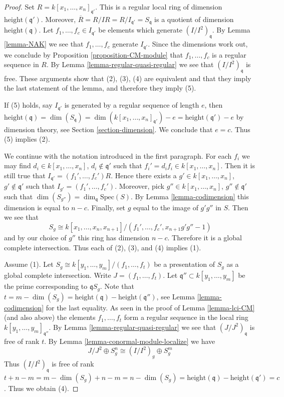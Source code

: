 \begin{proof}
Set $R = k[x_1, \ldots, x_n]_{\mathfrak q'}$. This is a regular local
ring of dimension $\text{height}(\mathfrak q')$. Moreover,
$\overline{R} = R/IR = R/I_{\mathfrak q'} = S_{\mathfrak q}$
is a quotient of dimension $\text{height}(\mathfrak q)$.
Let $f_1, \ldots, f_c \in I_{\mathfrak q'}$ be elements
which generate $(I/I^2)_{\mathfrak q}$. By Lemma \ref{lemma-NAK}
we see that $f_1, \ldots, f_c$ generate $I_{\mathfrak q'}$.
Since the dimensions work out, we conclude
by Proposition \ref{proposition-CM-module} that
$f_1, \ldots, f_c$ is a regular sequence in $R$.
By Lemma \ref{lemma-regular-quasi-regular} we see that
$(I/I^2)_{\mathfrak q}$ is free.
These arguments show that (2), (3), (4) are equivalent and
that they imply the last statement of the lemma, and therefore
they imply (5).

\medskip\noindent
If (5) holds, say $I_{\mathfrak q'}$ is generated by a regular
sequence of length $e$, then
$\text{height}(\mathfrak q) = \dim(S_{\mathfrak q}) =
\dim(k[x_1, \ldots, x_n]_{\mathfrak q'}) - e =
\text{height}(\mathfrak q') - e$ by dimension theory,
see Section \ref{section-dimension}. We conclude that $e = c$.
Thus (5) implies (2).

\medskip\noindent
We continue with the notation introduced in the first paragraph.
For each $f_i$ we may find $d_i \in k[x_1, \ldots, x_n]$,
$d_i \not \in \mathfrak q'$ such that
$f_i' = d_i f_i \in k[x_1, \ldots, x_n]$.
Then it is still true that $I_{\mathfrak q'} = (f_1', \ldots, f_c')R$.
Hence there exists a $g' \in k[x_1, \ldots, x_n]$, $g' \not \in \mathfrak q'$
such that $I_{g'} = (f_1', \ldots, f_c')$.
Moreover, pick $g'' \in k[x_1, \ldots, x_n]$, $g'' \not \in \mathfrak q'$
such that $\dim(S_{g''}) = \dim_{\mathfrak q} \text{Spec}(S)$.
By Lemma \ref{lemma-codimension} this dimension is equal to $n - c$.
Finally, set $g$ equal to the image of $g'g''$ in $S$.
Then we see that
$$
S_g \cong k[x_1, \ldots, x_n, x_{n + 1}]
/
(f_1', \ldots, f_c', x_{n + 1}g'g'' - 1)
$$
and by our choice of $g''$ this ring has dimension $n - c$.
Therefore it is a global complete intersection.
Thus each of (2), (3), and (4) implies (1).

\medskip\noindent
Assume (1). Let $S_g \cong k[y_1, \ldots, y_m]/(f_1, \ldots, f_t)$
be a presentation of $S_g$ as a global complete intersection.
Write $J = (f_1, \ldots, f_t)$. Let $\mathfrak q'' \subset k[y_1, \ldots, y_m]$
be the prime corresponding to $\mathfrak qS_g$. Note that
$t = m - \dim(S_g) =
\text{height}(\mathfrak q) - \text{height}(\mathfrak q'')$,
see Lemma \ref{lemma-codimension} for the last equality.
As seen in the proof of Lemma \ref{lemma-lci-CM} (and also above) the elements
$f_1, \ldots, f_t$ form a regular sequence in the local ring
$k[y_1, \ldots, y_m]_{\mathfrak q''}$.
By Lemma \ref{lemma-regular-quasi-regular} we see that
$(J/J^2)_{\mathfrak q}$ is free of rank $t$.
By Lemma \ref{lemma-conormal-module-localize} we have
$$
J/J^2 \oplus S_g^n \cong (I/I^2)_g \oplus S_g^m
$$
Thus $(I/I^2)_{\mathfrak q}$ is free of rank
$t + n - m = m - \dim(S_g) + n - m = n - \dim(S_g) =
\text{height}(\mathfrak q) - \text{height}(\mathfrak q') = c$.
Thus we obtain (4).
\end{proof}

